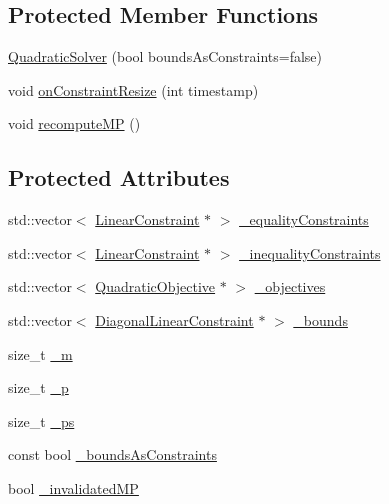\subsection*{Protected Member Functions}
\begin{DoxyCompactItemize}
\item 
\hyperlink{classocra_1_1QuadraticSolver_a1441484062835e6d3e1a86dbf8fa3eb2}{Quadratic\+Solver} (bool bounds\+As\+Constraints=false)
\item 
void \hyperlink{classocra_1_1QuadraticSolver_aea64c3c099130835a5f42051921a0b6d}{on\+Constraint\+Resize} (int timestamp)
\item 
void \hyperlink{classocra_1_1QuadraticSolver_a8494b09625e461a6fa73e2cca762abae}{recompute\+MP} ()
\end{DoxyCompactItemize}
\subsection*{Protected Attributes}
\begin{DoxyCompactItemize}
\item 
std\+::vector$<$ \hyperlink{namespaceocra_ae8b87cf4099be3efc3b410019ad2046e}{Linear\+Constraint} $\ast$ $>$ \hyperlink{classocra_1_1QuadraticSolver_a0068a59d185c9556a0179dae5c5a2ff4}{\+\_\+equality\+Constraints}
\item 
std\+::vector$<$ \hyperlink{namespaceocra_ae8b87cf4099be3efc3b410019ad2046e}{Linear\+Constraint} $\ast$ $>$ \hyperlink{classocra_1_1QuadraticSolver_af8ca3b3596faeedf97437b9b7d85a7f3}{\+\_\+inequality\+Constraints}
\item 
std\+::vector$<$ \hyperlink{namespaceocra_a0b50673710f087c0f1733aefd1a8e0f7}{Quadratic\+Objective} $\ast$ $>$ \hyperlink{classocra_1_1QuadraticSolver_a5c5ba942644eceb02326095343a642cb}{\+\_\+objectives}
\item 
std\+::vector$<$ \hyperlink{namespaceocra_ab310e2c53f5e52ec3aba0a832f7dc79e}{Diagonal\+Linear\+Constraint} $\ast$ $>$ \hyperlink{classocra_1_1QuadraticSolver_a5d2a0ca5a490f8c210780f281f0961e3}{\+\_\+bounds}
\item 
size\+\_\+t \hyperlink{classocra_1_1QuadraticSolver_a7138115950652cc14b22ca87d8fc8b64}{\+\_\+m}
\item 
size\+\_\+t \hyperlink{classocra_1_1QuadraticSolver_aee2e8409ab5338029910a78e2e196cd3}{\+\_\+p}
\item 
size\+\_\+t \hyperlink{classocra_1_1QuadraticSolver_a8818ed9913cda8253fd181e46e963f58}{\+\_\+ps}
\item 
const bool \hyperlink{classocra_1_1QuadraticSolver_aad4e1bd8a751c4e827d5a637b1c2e9fb}{\+\_\+bounds\+As\+Constraints}
\item 
bool \hyperlink{classocra_1_1QuadraticSolver_aadb395a0722e77c9ea19ed8968916c0e}{\+\_\+invalidated\+MP}
\end{DoxyCompactItemize}
